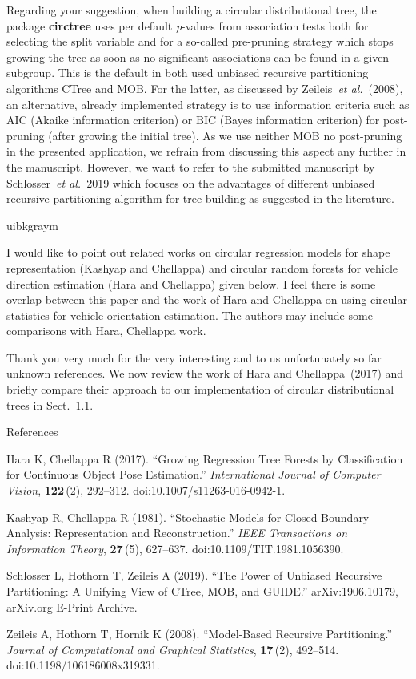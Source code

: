 \documentclass[english, noconfig]{uibklttr}
\newenvironment{re}{
    \begin{color}{uibkgraym}
        \itshape
}{
    \end{color}
}
\begin{document}
Regarding your suggestion, when building
a circular distributional tree, the package \textbf{circtree} uses per default
\emph{p}-values from association tests both for selecting the split variable
and for a so-called pre-pruning strategy which stops growing the tree as soon as
no significant associations can be found in a given subgroup. This is the
default in both used unbiased recursive partitioning algorithms CTree
and MOB. For the latter, as discussed by Zeileis~\emph{et al.}~(2008), an
alternative, already implemented strategy  is to
use information criteria such as AIC (Akaike information criterion) or BIC
(Bayes information criterion) for post-pruning (after growing the initial tree). 
As we use neither MOB no post-pruning in the
presented application, we refrain from discussing this aspect any further in
the manuscript. However, we want to refer to the submitted manuscript by
Schlosser~\emph{et al.}~2019 which focuses on the advantages of different
unbiased recursive partitioning algorithm for tree building as suggested in the literature.

\vspace{0.5em}
\begin{re}
I would like to point out related works on circular regression models for
shape representation (Kashyap and Chellappa) and circular random forests for
vehicle direction estimation (Hara and Chellappa) given below. I feel there is
some overlap between this paper and the work of Hara and Chellappa on using
circular statistics for vehicle orientation estimation. The authors may include
some comparisons with Hara, Chellappa work.
\end{re}

Thank you very much for the very interesting and to us unfortunately so far unknown references.
We now review the work of Hara and Chellappa~(2017) and briefly compare their approach
to our implementation of circular distributional trees in Sect.~1.1.

\vspace{0.5cm}
References

Hara K, Chellappa R (2017). ``Growing Regression Tree Forests by
Classification for Continuous Object Pose Estimation.'' \emph{International
Journal of Computer Vision}, \textbf{122}\,(2), 292--312.
doi:10.1007/s11263-016-0942-1.

Kashyap R, Chellappa R (1981). ``Stochastic Models for Closed Boundary
Analysis: Representation and Reconstruction.'' \emph{IEEE Transactions on
Information Theory}, \textbf{27}\,(5), 627--637. doi:10.1109/TIT.1981.1056390.

Schlosser L, Hothorn T, Zeileis A (2019). ``The Power of Unbiased Recursive
Partitioning: A Unifying View of CTree, MOB, and GUIDE.'' arXiv:1906.10179,
arXiv.org E-Print Archive.

Zeileis A, Hothorn T, Hornik K (2008). ``Model-Based Recursive Partitioning.''
\emph{Journal of Computational and Graphical Statistics}, \textbf{17}\,(2),
492--514. doi:10.1198/106186008x319331.
\end{document}

